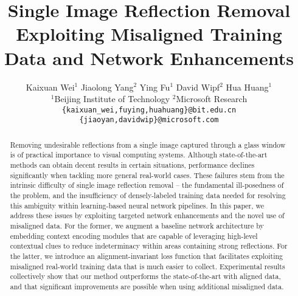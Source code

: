 \documentclass[10pt,twocolumn,letterpaper]{article}
\begin{document}
\title{Single Image Reflection Removal Exploiting Misaligned Training Data and Network Enhancements}

\author{Kaixuan Wei$^1$  \quad Jiaolong Yang$^2$ \quad Ying Fu$^1$ \quad David Wipf$^2$ \quad Hua Huang$^1$
\\ $^1$Beijing Institute of Technology \quad $^2$Microsoft  Research\\
{\tt\small \{kaixuan\_wei,fuying,huahuang\}@bit.edu.cn} \quad
{\tt\small \{jiaoyan,davidwip\}@microsoft.com}
}



\maketitle


\begin{abstract}
Removing undesirable reflections from a single image captured through a glass window is of practical importance to visual computing systems. Although state-of-the-art methods can obtain decent results in certain situations, performance declines significantly when tackling more general real-world cases.  These failures stem from the intrinsic difficulty of single image reflection removal -- the fundamental ill-posedness of the problem, and the insufficiency of densely-labeled training data needed for resolving this ambiguity within learning-based neural network pipelines. In this paper, we address these issues by exploiting targeted network enhancements and the novel use of misaligned data. For the former, we augment a baseline network architecture by embedding context encoding modules that are capable of leveraging high-level contextual clues to reduce indeterminacy within areas containing strong reflections. For the latter, we introduce an alignment-invariant loss function that facilitates exploiting misaligned real-world training data that is much easier to collect.  Experimental results collectively show that our method outperforms the state-of-the-art with aligned data, and that significant improvements are possible when using additional misaligned data. 
\end{abstract}
\end{document}
